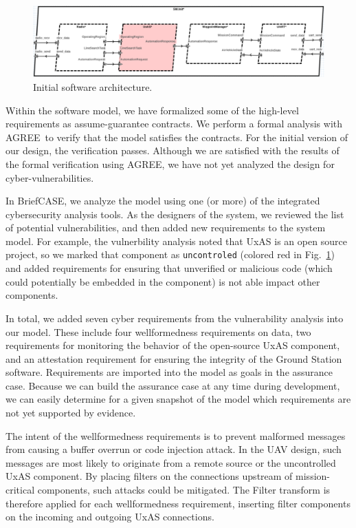 \documentclass[global,twocolumn]{svjour}
\newcommand{\figref}[1]{Fig.~\ref{#1}}
\newcommand{\brfcs}{BriefCASE}
\newcommand{\agr}{AGREE}
\begin{document}
\begin{figure}[h]
	\centering
	\includegraphics[width=2\columnwidth]{figs/sw-initial.png}
	\caption{Initial software architecture.}
	\label{fig:sw-initial}
\end{figure}

Within the software model, we have formalized some of the high-level requirements as assume-guarantee contracts.
%
We perform a formal analysis with \agr\ to verify that the model satisfies the contracts.
%
For the initial version of our design, the verification passes.
%
Although we are satisfied with the results of the formal verification using AGREE, we have not yet analyzed the design for cyber-vulnerabilities.

In \brfcs, we analyze the model using one (or more) of the integrated cybersecurity analysis tools.
%
As the designers of the system, we reviewed the list of potential vulnerabilities, and then added new requirements to the system model.
%
For example, the vulnerbility analysis noted that UxAS is an open source project, so we marked that component as \texttt{uncontroled} (colored red in \figref{fig:sw-initial}) and added requirements for ensuring that unverified or malicious code (which could potentially be embedded in the component) is not able impact other components.

In total, we added seven cyber requirements from the vulnerability analysis into our model.
%
These include four wellformedness requirements on data, two requirements for monitoring the behavior of the open-source UxAS component, and an attestation requirement for ensuring the integrity of the Ground Station software.
%
Requirements are imported into the model as goals in the assurance case.
%
Because we can build the assurance case at any time during development, we can easily determine for a given snapshot of the model which requirements are not yet supported by evidence.

The intent of the wellformedness requirements is to prevent malformed messages from causing a buffer overrun or code injection attack.
%
In the UAV design, such messages are most likely to originate from a remote source or the uncontrolled UxAS component.
%
By placing filters on the connections upstream of mission-critical components, such attacks could be mitigated.
%
The Filter transform is therefore applied for each wellformedness requirement, inserting filter components on the incoming and outgoing UxAS connections.
\end{document}
